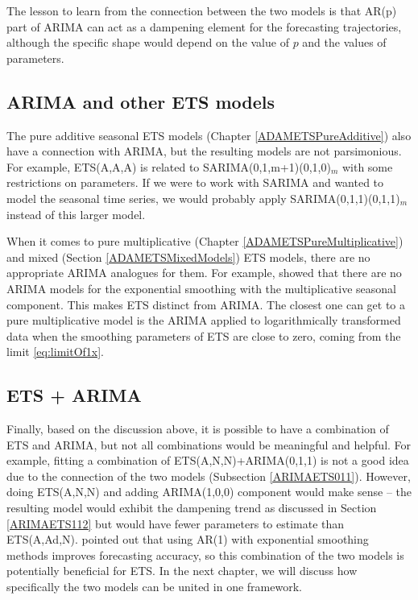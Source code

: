 \documentclass[]{book}
\theoremstyle{definition}
\theoremstyle{definition}
\theoremstyle{definition}
\theoremstyle{definition}
\theoremstyle{remark}
\begin{document}
The lesson to learn from the connection between the two models is that AR(p) part of ARIMA can act as a dampening element for the forecasting trajectories, although the specific shape would depend on the value of \(p\) and the values of parameters.

\hypertarget{ARIMAETSOther}{%
\subsection{ARIMA and other ETS models}\label{ARIMAETSOther}}

The pure additive seasonal ETS models (Chapter \ref{ADAMETSPureAdditive}) also have a connection with ARIMA, but the resulting models are not parsimonious. For example, ETS(A,A,A) is related to SARIMA(0,1,m+1)(0,1,0)\(_m\) \citep{Mckenzie1976, Chatfield1977} with some restrictions on parameters. If we were to work with SARIMA and wanted to model the seasonal time series, we would probably apply SARIMA(0,1,1)(0,1,1)\(_m\) instead of this larger model.

When it comes to pure multiplicative (Chapter \ref{ADAMETSPureMultiplicative}) and mixed (Section \ref{ADAMETSMixedModels}) ETS models, there are no appropriate ARIMA analogues for them. For example, \citet{Chatfield1977} showed that there are no ARIMA models for the exponential smoothing with the multiplicative seasonal component. This makes ETS distinct from ARIMA. The closest one can get to a pure multiplicative model is the ARIMA applied to logarithmically transformed data when the smoothing parameters of ETS are close to zero, coming from the limit \eqref{eq:limitOf1x}.

\hypertarget{ets-arima}{%
\subsection{ETS + ARIMA}\label{ets-arima}}

Finally, based on the discussion above, it is possible to have a combination of ETS and ARIMA, but not all combinations would be meaningful and helpful. For example, fitting a combination of ETS(A,N,N)+ARIMA(0,1,1) is not a good idea due to the connection of the two models (Subsection \ref{ARIMAETS011}). However, doing ETS(A,N,N) and adding ARIMA(1,0,0) component would make sense -- the resulting model would exhibit the dampening trend as discussed in Section \ref{ARIMAETS112} but would have fewer parameters to estimate than ETS(A,Ad,N). \citet{Gardner1985} pointed out that using AR(1) with exponential smoothing methods improves forecasting accuracy, so this combination of the two models is potentially beneficial for ETS. In the next chapter, we will discuss how specifically the two models can be united in one framework.
\end{document}

